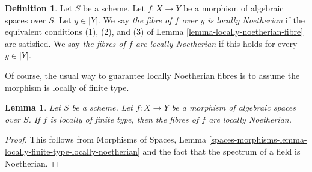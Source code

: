 \documentclass{stacks-project}
\theoremstyle{plain}
\newtheorem{lemma}[subsection]{Lemma}
\theoremstyle{definition}
\newtheorem{definition}[subsection]{Definition}
\theoremstyle{remark}
\numberwithin{equation}{subsection}
\begin{document}
\begin{definition}
\label{definition-locally-Noetherian-fibre}
Let $S$ be a scheme. Let $f : X \to Y$ be a morphism of algebraic spaces
over $S$. Let $y \in |Y|$. We say {\it the fibre of $f$ over $y$ is
locally Noetherian} if the equivalent conditions (1), (2), and (3)
of Lemma \ref{lemma-locally-noetherian-fibre} are satisfied.
We say {\it the fibres of $f$ are locally Noetherian} if this
holds for every $y \in |Y|$.
\end{definition}

\noindent
Of course, the usual way to guarantee locally Noetherian fibres is
to assume the morphism is locally of finite type.

\begin{lemma}
\label{lemma-locally-finite-type-locally-Noetherian-fibres}
Let $S$ be a scheme. Let $f : X \to Y$ be a morphism of algebraic spaces
over $S$. If $f$ is locally of finite type, then 
the fibres of $f$ are locally Noetherian.
\end{lemma}

\begin{proof}
This follows from Morphisms of Spaces, Lemma
\ref{spaces-morphisms-lemma-locally-finite-type-locally-noetherian}
and the fact that the spectrum of a field is Noetherian.
\end{proof}
\end{document}
